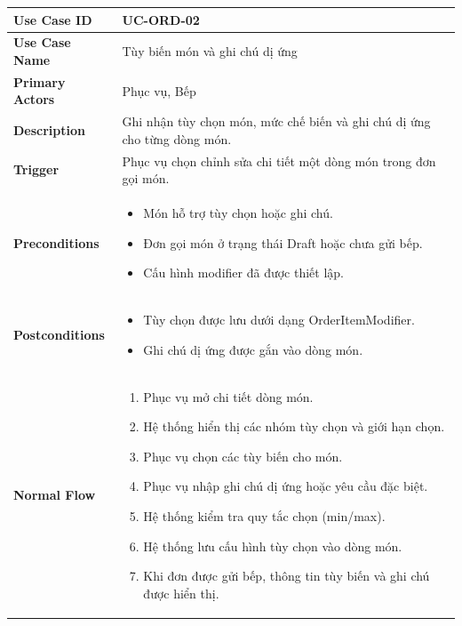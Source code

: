 \begin{longtable}{|p{4cm}|p{10cm}|}
\hline
\textbf{Use Case ID} & UC-ORD-02 \\ \hline
\textbf{Use Case Name} & Tùy biến món và ghi chú dị ứng \\ \hline
\textbf{Primary Actors} & Phục vụ, Bếp \\ \hline

\textbf{Description} & Ghi nhận tùy chọn món, mức chế biến và ghi chú dị ứng cho từng dòng món. \\ \hline

\textbf{Trigger} & Phục vụ chọn chỉnh sửa chi tiết một dòng món trong đơn gọi món. \\ \hline

\textbf{Preconditions} &
\begin{itemize}[leftmargin=*, noitemsep]
  \item Món hỗ trợ tùy chọn hoặc ghi chú.
  \item Đơn gọi món ở trạng thái \textsf{Draft} hoặc chưa gửi bếp.
  \item Cấu hình modifier đã được thiết lập.
\end{itemize} \\ \hline

\textbf{Postconditions} &
\begin{itemize}[leftmargin=*, noitemsep]
  \item Tùy chọn được lưu dưới dạng \textsf{OrderItemModifier}.
  \item Ghi chú dị ứng được gắn vào dòng món.
\end{itemize} \\ \hline

\textbf{Normal Flow} &
\begin{enumerate}[leftmargin=*, noitemsep]
  \item Phục vụ mở chi tiết dòng món.
  \item Hệ thống hiển thị các nhóm tùy chọn và giới hạn chọn.
  \item Phục vụ chọn các tùy biến cho món.
  \item Phục vụ nhập ghi chú dị ứng hoặc yêu cầu đặc biệt.
  \item Hệ thống kiểm tra quy tắc chọn (min/max).
  \item Hệ thống lưu cấu hình tùy chọn vào dòng món.
  \item Khi đơn được gửi bếp, thông tin tùy biến và ghi chú được hiển thị.
\end{enumerate} \\ \hline


\end{longtable}
